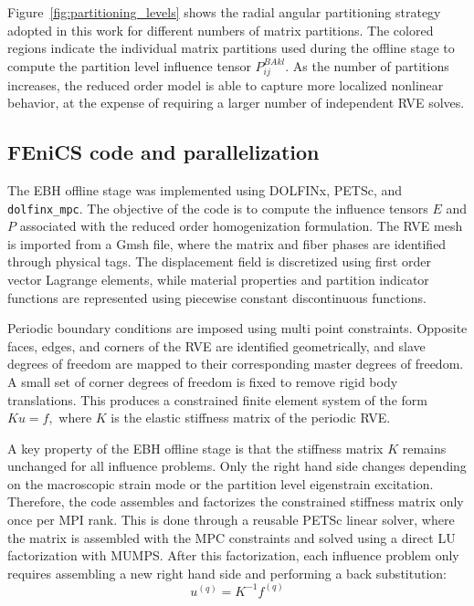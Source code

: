 \documentclass[12pt]{article}
\begin{document}
Figure~\ref{fig:partitioning_levels} shows the radial angular partitioning strategy adopted in this work for different numbers of matrix partitions. The colored regions indicate the individual matrix partitions used during the offline stage to compute the partition level influence tensor $P^{BAkl}_{ij}$. As the number of partitions increases, the reduced order model is able to capture more localized nonlinear behavior, at the expense of requiring a larger number of independent RVE solves.

\subsection{FEniCS code and parallelization}
The EBH offline stage was implemented using DOLFINx, PETSc, and \texttt{dolfinx\_mpc}. The objective of the code is to compute the influence tensors $E$ and $P$ associated with the reduced order homogenization formulation. The RVE mesh is imported from a Gmsh file, where the matrix and fiber phases are identified through physical tags. The displacement field is discretized using first order vector Lagrange elements, while material properties and partition indicator functions are represented using piecewise constant discontinuous functions.

Periodic boundary conditions are imposed using multi point constraints. Opposite faces, edges, and corners of the RVE are identified geometrically, and slave degrees of freedom are mapped to their corresponding master degrees of freedom. A small set of corner degrees of freedom is fixed to remove rigid body translations. This produces a constrained finite element system of the form \cite{FishBelytschko2007} $K u = f,$ where $K$ is the elastic stiffness matrix of the periodic RVE.

A key property of the EBH offline stage is that the stiffness matrix $K$ remains unchanged for all influence problems. Only the right hand side changes depending on the macroscopic strain mode or the partition level eigenstrain excitation. Therefore, the code assembles and factorizes the constrained stiffness matrix only once per MPI rank. This is done through a reusable PETSc linear solver, where the matrix is assembled with the MPC constraints and solved using a direct LU factorization with MUMPS. After this factorization, each influence problem only requires assembling a new right hand side and performing a back substitution:
\begin{equation}
u^{(q)} = K^{-1} f^{(q)}
\end{equation}
\end{document}
